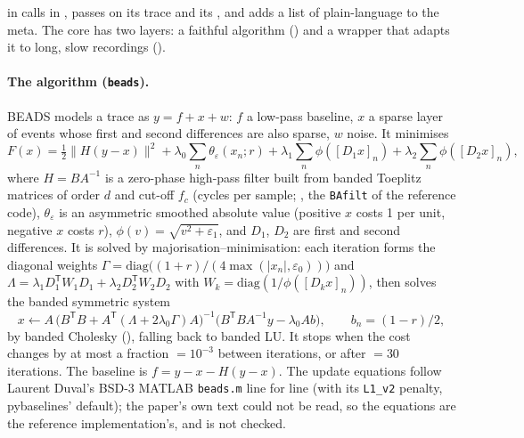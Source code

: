  in  calls  in
, passes on its  trace and its ,
and adds a list of plain-language  to the meta. The core has two layers: a faithful
algorithm () and a wrapper that adapts it to long, slow recordings
().

\paragraph{The algorithm (\texttt{beads}).} BEADS \citep{ning2014chromatogram} models a trace as
$y = f + x + w$: $f$ a low-pass baseline, $x$ a sparse layer of events whose first and second
differences are also sparse, $w$ noise. It minimises
\[
F(x) = \tfrac12\lVert H(y-x)\rVert^2 + \lambda_0\sum_n \theta_\varepsilon(x_n; r)
  + \lambda_1\sum_n \phi([D_1x]_n) + \lambda_2\sum_n \phi([D_2x]_n),
\]
where $H = BA^{-1}$ is a zero-phase high-pass filter built from banded Toeplitz matrices of order
$d$ and cut-off $f_c$ (cycles per sample; , the \texttt{BAfilt} of the
reference code), $\theta_\varepsilon$ is an asymmetric smoothed absolute value (positive $x$
costs 1 per unit, negative $x$ costs $r$), $\phi(v) = \sqrt{v^2+\varepsilon_1}$, and $D_1$,
$D_2$ are first and second differences. It is solved by majorisation--minimisation: each
iteration forms the diagonal weights $\Gamma = \mathrm{diag}\bigl((1+r)/(4\max(|x_n|,
\varepsilon_0))\bigr)$ and $\Lambda = \lambda_1 D_1^{\mathsf T}W_1D_1 + \lambda_2
D_2^{\mathsf T}W_2D_2$ with $W_k = \mathrm{diag}(1/\phi([D_kx]_n))$, then solves the banded
symmetric system
\[
x \leftarrow A\,\bigl(B^{\mathsf T}B + A^{\mathsf T}(\Lambda + 2\lambda_0\Gamma)A\bigr)^{-1}
  \bigl(B^{\mathsf T}BA^{-1}y - \lambda_0 A b\bigr), \qquad b_n = (1-r)/2,
\]
by banded Cholesky (), falling back to banded LU. It stops when
the cost changes by at most a fraction  $= 10^{-3}$ between iterations, or after
 $= 30$ iterations. The baseline is $f = y - x - H(y-x)$. The update equations
follow Laurent Duval's BSD-3 MATLAB \texttt{beads.m} line for line (with its \texttt{L1\_v2}
penalty, pybaselines' default); the paper's own text could not be read, so the equations are
the reference implementation's, and  is not
checked.


